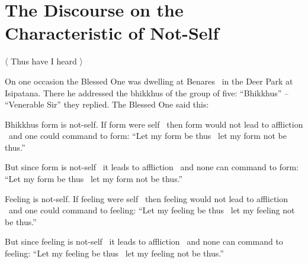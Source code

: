 \section{The Discourse on the Characteristic of Not-Self}
\label{characteristic-of-not-self}

\begin{leader-english}
  〈 Thus have I heard 〉
\end{leader-english}

\smallskip

\begin{english-only-hang}
  On one occasion\hyperlink{endnote107-appendix}{\hypertarget{endnote107-body}{}}
  the Blessed One was dwelling at Benares \breathmark\ in the Deer Park at Isipatana. There he addressed the bhikkhus of the group of five: ``Bhikkhus'' – ``Venerable Sir'' they replied. The Blessed One said this:\hyperlink{endnote108-appendix}{\hypertarget{endnote108-body}{}}
\end{english-only-hang}

\begin{english-only-hang}
  Bhikkhus form is not-self. If form were self \breathmark\ then form would not lead to affliction \breathmark\ and one could command to form: ``Let my form be thus \breathmark\ let my form not be thus.''
\end{english-only-hang}

\begin{english-only-hangtogether}
  But since form is not-self \breathmark\ it leads to affliction \breathmark\ and none can command to form: ``Let my form be thus \breathmark\ let my form not be thus.''
\end{english-only-hangtogether}

\begin{english-only-hang}
  Feeling is not-self. If feeling were self \breathmark\ then feeling would not lead to affliction \breathmark\ and one could command to feeling: ``Let my feeling be thus \breathmark\ let my feeling not be thus.''
\end{english-only-hang}

\begin{english-only-hangtogether}
  But since feeling is not-self \breathmark\ it leads to affliction \breathmark\ and none can command to feeling: ``Let my feeling be thus \breathmark\ let my feeling not be thus.''
\end{english-only-hangtogether}

